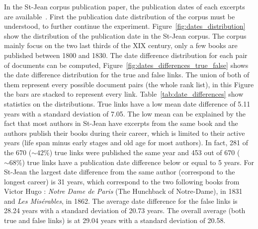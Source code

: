 In the St-Jean corpus publication paper, the publication dates of each excerpts are available~\cite{st_jean}.
First the publication date distribution of the corpus must be understood, to further continue the experiment.
Figure~\ref{fig:dates_distribution} show the distribution of the publication date in the St-Jean corpus.
The corpus mainly focus on the two last thirds of the XIX century, only a few books are published between 1800 and 1830.
The date difference distribution for each pair of documents can be computed, Figure~\ref{fig:dates_differences_true_false} shows the date difference distribution for the true and false links.
The union of both of them represent every possible document pairs (the whole rank list), in this Figure the bars are stacked to represent every link.
Table~\ref{tab:date_differences} show statistics on the distributions.
True links have a low mean date difference of 5.11 years with a standard deviation of 7.05.
The low mean can be explained by the fact that most authors in St-Jean have excerpts from the same book and the authors publish their books during their career, which is limited to their active years (life span minus early stages and old age for most authors).
In fact, 281 of the 670 ($\sim 42\%$) true links were published the same year and 453 out of 670 ($\sim 68\%$) true links have a publication date difference below or equal to 5 years.
For St-Jean the largest date difference from the same author (correspond to the longest career) is 31 years, which correspond to the two following books  from Victor Hugo : \textit{Notre Dame de Paris} (The Hunchback of Notre-Dame), in 1831 and \textit{Les Misérables}, in 1862.
The average date difference for the false links is 28.24 years with a standard deviation of 20.73 years.
The overall average (both true and false links) is at 29.04 years with a standard deviation of 20.58.

